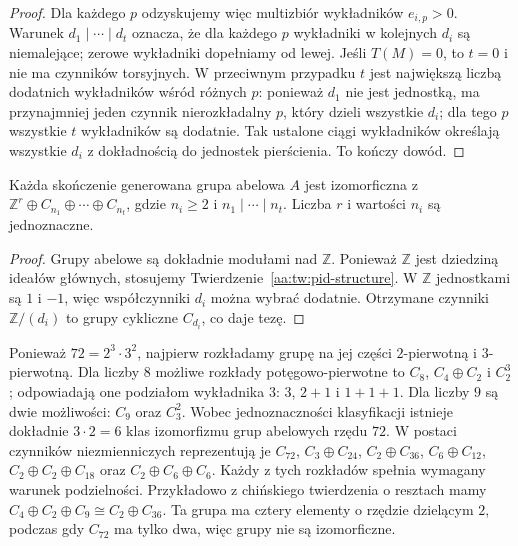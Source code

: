 \begin{proof}
Dla każdego $p$ odzyskujemy więc multizbiór wykładników
$e_{i,p}>0$. Warunek $d_1\mid\cdots\mid d_t$ oznacza,
że dla każdego $p$ wykładniki w kolejnych $d_i$
są niemalejące; zerowe wykładniki dopełniamy od lewej.
Jeśli $T(M)=0$, to $t=0$ i nie ma czynników torsyjnych.
W przeciwnym przypadku $t$ jest największą liczbą
dodatnich wykładników wśród różnych $p$: ponieważ
$d_1$ nie jest jednostką, ma przynajmniej jeden
czynnik nierozkładalny $p$, który dzieli wszystkie
$d_i$; dla tego $p$ wszystkie $t$ wykładników są dodatnie.
Tak ustalone ciągi wykładników określają wszystkie $d_i$
z dokładnością do jednostek pierścienia. To kończy dowód.
\end{proof}

\begin{wniosek}
\label{aa:wn:abelian-fg-structure}
Każda skończenie generowana grupa abelowa $A$ jest izomorficzna z
$\mathbb Z^r\oplus C_{n_1}\oplus\cdots\oplus C_{n_t}$,
gdzie $n_i\ge2$ i $n_1\mid\cdots\mid n_t$.
Liczba $r$ i wartości $n_i$ są jednoznaczne.
\end{wniosek}
\begin{proof}
Grupy abelowe są dokładnie modułami nad $\mathbb Z$.
Ponieważ $\mathbb Z$ jest dziedziną ideałów głównych,
stosujemy Twierdzenie~\ref{aa:tw:pid-structure}.
W $\mathbb Z$ jednostkami są $1$ i $-1$,
więc współczynniki $d_i$ można wybrać dodatnie.
Otrzymane czynniki $\mathbb Z/(d_i)$ to grupy cykliczne
$C_{d_i}$, co daje tezę.
\end{proof}

\begin{przyklad}
\label{aa:prz:abelian-order72}
Ponieważ $72=2^3\cdot3^2$, najpierw rozkładamy grupę
na jej części $2$-pierwotną i $3$-pierwotną.
Dla liczby $8$ możliwe rozkłady potęgowo-pierwotne to
$C_8$, $C_4\oplus C_2$ i $C_2^3$; odpowiadają one
podziałom wykładnika $3$: $3$, $2+1$ i $1+1+1$.
Dla liczby $9$ są dwie możliwości: $C_9$ oraz $C_3^2$.
Wobec jednoznaczności klasyfikacji istnieje dokładnie
$3\cdot2=6$ klas izomorfizmu grup abelowych rzędu $72$.
W postaci czynników niezmienniczych reprezentują je
$C_{72}$, $C_3\oplus C_{24}$, $C_2\oplus C_{36}$,
$C_6\oplus C_{12}$, $C_2\oplus C_2\oplus C_{18}$ oraz
$C_2\oplus C_6\oplus C_6$. Każdy z tych rozkładów
spełnia wymagany warunek podzielności.
Przykładowo z chińskiego twierdzenia o resztach mamy
$C_4\oplus C_2\oplus C_9\cong C_2\oplus C_{36}$.
Ta grupa ma cztery elementy o rzędzie dzielącym $2$,
podczas gdy $C_{72}$ ma tylko dwa, więc grupy
nie są izomorficzne.
\end{przyklad}

